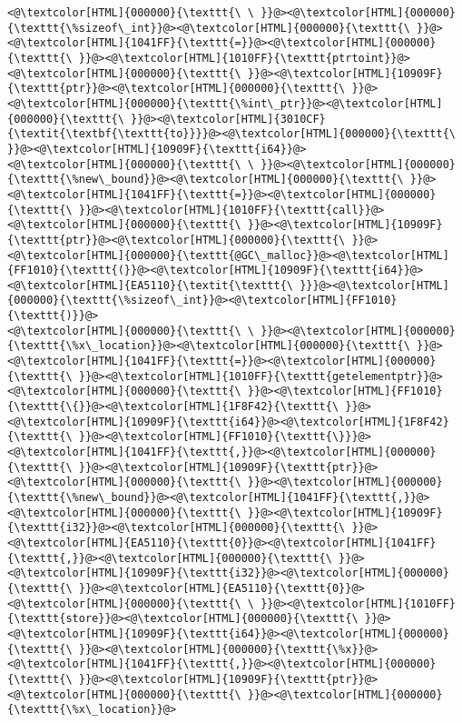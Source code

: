 \begin{lstlisting}
<@\textcolor[HTML]{000000}{\texttt{\ \ }}@><@\textcolor[HTML]{000000}{\texttt{\%sizeof\_int}}@><@\textcolor[HTML]{000000}{\texttt{\ }}@><@\textcolor[HTML]{1041FF}{\texttt{=}}@><@\textcolor[HTML]{000000}{\texttt{\ }}@><@\textcolor[HTML]{1010FF}{\texttt{ptrtoint}}@><@\textcolor[HTML]{000000}{\texttt{\ }}@><@\textcolor[HTML]{10909F}{\texttt{ptr}}@><@\textcolor[HTML]{000000}{\texttt{\ }}@><@\textcolor[HTML]{000000}{\texttt{\%int\_ptr}}@><@\textcolor[HTML]{000000}{\texttt{\ }}@><@\textcolor[HTML]{3010CF}{\textit{\textbf{\texttt{to}}}}@><@\textcolor[HTML]{000000}{\texttt{\ }}@><@\textcolor[HTML]{10909F}{\texttt{i64}}@>
<@\textcolor[HTML]{000000}{\texttt{\ \ }}@><@\textcolor[HTML]{000000}{\texttt{\%new\_bound}}@><@\textcolor[HTML]{000000}{\texttt{\ }}@><@\textcolor[HTML]{1041FF}{\texttt{=}}@><@\textcolor[HTML]{000000}{\texttt{\ }}@><@\textcolor[HTML]{1010FF}{\texttt{call}}@><@\textcolor[HTML]{000000}{\texttt{\ }}@><@\textcolor[HTML]{10909F}{\texttt{ptr}}@><@\textcolor[HTML]{000000}{\texttt{\ }}@><@\textcolor[HTML]{000000}{\texttt{@GC\_malloc}}@><@\textcolor[HTML]{FF1010}{\texttt{(}}@><@\textcolor[HTML]{10909F}{\texttt{i64}}@><@\textcolor[HTML]{EA5110}{\textit{\texttt{\ }}}@><@\textcolor[HTML]{000000}{\texttt{\%sizeof\_int}}@><@\textcolor[HTML]{FF1010}{\texttt{)}}@>
<@\textcolor[HTML]{000000}{\texttt{\ \ }}@><@\textcolor[HTML]{000000}{\texttt{\%x\_location}}@><@\textcolor[HTML]{000000}{\texttt{\ }}@><@\textcolor[HTML]{1041FF}{\texttt{=}}@><@\textcolor[HTML]{000000}{\texttt{\ }}@><@\textcolor[HTML]{1010FF}{\texttt{getelementptr}}@><@\textcolor[HTML]{000000}{\texttt{\ }}@><@\textcolor[HTML]{FF1010}{\texttt{\{}}@><@\textcolor[HTML]{1F8F42}{\texttt{\ }}@><@\textcolor[HTML]{10909F}{\texttt{i64}}@><@\textcolor[HTML]{1F8F42}{\texttt{\ }}@><@\textcolor[HTML]{FF1010}{\texttt{\}}}@><@\textcolor[HTML]{1041FF}{\texttt{,}}@><@\textcolor[HTML]{000000}{\texttt{\ }}@><@\textcolor[HTML]{10909F}{\texttt{ptr}}@><@\textcolor[HTML]{000000}{\texttt{\ }}@><@\textcolor[HTML]{000000}{\texttt{\%new\_bound}}@><@\textcolor[HTML]{1041FF}{\texttt{,}}@><@\textcolor[HTML]{000000}{\texttt{\ }}@><@\textcolor[HTML]{10909F}{\texttt{i32}}@><@\textcolor[HTML]{000000}{\texttt{\ }}@><@\textcolor[HTML]{EA5110}{\texttt{0}}@><@\textcolor[HTML]{1041FF}{\texttt{,}}@><@\textcolor[HTML]{000000}{\texttt{\ }}@><@\textcolor[HTML]{10909F}{\texttt{i32}}@><@\textcolor[HTML]{000000}{\texttt{\ }}@><@\textcolor[HTML]{EA5110}{\texttt{0}}@>
<@\textcolor[HTML]{000000}{\texttt{\ \ }}@><@\textcolor[HTML]{1010FF}{\texttt{store}}@><@\textcolor[HTML]{000000}{\texttt{\ }}@><@\textcolor[HTML]{10909F}{\texttt{i64}}@><@\textcolor[HTML]{000000}{\texttt{\ }}@><@\textcolor[HTML]{000000}{\texttt{\%x}}@><@\textcolor[HTML]{1041FF}{\texttt{,}}@><@\textcolor[HTML]{000000}{\texttt{\ }}@><@\textcolor[HTML]{10909F}{\texttt{ptr}}@><@\textcolor[HTML]{000000}{\texttt{\ }}@><@\textcolor[HTML]{000000}{\texttt{\%x\_location}}@>

\end{lstlisting}
